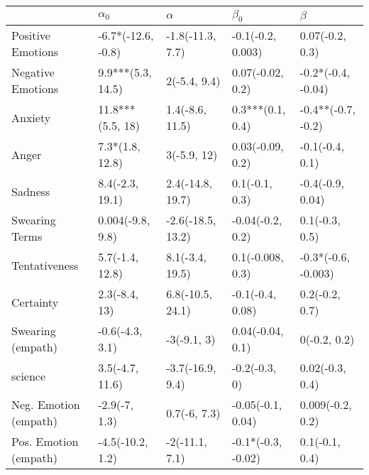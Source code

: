 \begin{tabular}{lllll}
\toprule
{} &          $\alpha_0$ &           $\alpha$ &           $\beta_0$ &              $\beta$ \\
\midrule
Positive Emotions     &  -6.7*(-12.6, -0.8) &   -1.8(-11.3, 7.7) &   -0.1(-0.2, 0.003) &      0.07(-0.2, 0.3) \\
Negative Emotions     &   9.9***(5.3, 14.5) &       2(-5.4, 9.4) &    0.07(-0.02, 0.2) &   -0.2*(-0.4, -0.04) \\
Anxiety               &    11.8***(5.5, 18) &    1.4(-8.6, 11.5) &    0.3***(0.1, 0.4) &   -0.4**(-0.7, -0.2) \\
Anger                 &     7.3*(1.8, 12.8) &        3(-5.9, 12) &    0.03(-0.09, 0.2) &      -0.1(-0.4, 0.1) \\
Sadness               &     8.4(-2.3, 19.1) &   2.4(-14.8, 19.7) &      0.1(-0.1, 0.3) &     -0.4(-0.9, 0.04) \\
Swearing Terms        &    0.004(-9.8, 9.8) &  -2.6(-18.5, 13.2) &    -0.04(-0.2, 0.2) &       0.1(-0.3, 0.5) \\
Tentativeness         &     5.7(-1.4, 12.8) &    8.1(-3.4, 19.5) &    0.1(-0.008, 0.3) &  -0.3*(-0.6, -0.003) \\
Certainty             &       2.3(-8.4, 13) &   6.8(-10.5, 24.1) &    -0.1(-0.4, 0.08) &       0.2(-0.2, 0.7) \\
Swearing (empath)     &     -0.6(-4.3, 3.1) &        -3(-9.1, 3) &    0.04(-0.04, 0.1) &         0(-0.2, 0.2) \\
science               &     3.5(-4.7, 11.6) &   -3.7(-16.9, 9.4) &       -0.2(-0.3, 0) &      0.02(-0.3, 0.4) \\
Neg. Emotion (empath) &       -2.9(-7, 1.3) &       0.7(-6, 7.3) &   -0.05(-0.1, 0.04) &     0.009(-0.2, 0.2) \\
Pos. Emotion (empath) &    -4.5(-10.2, 1.2) &     -2(-11.1, 7.1) &  -0.1*(-0.3, -0.02) &       0.1(-0.1, 0.4) \\
\bottomrule
\end{tabular}
